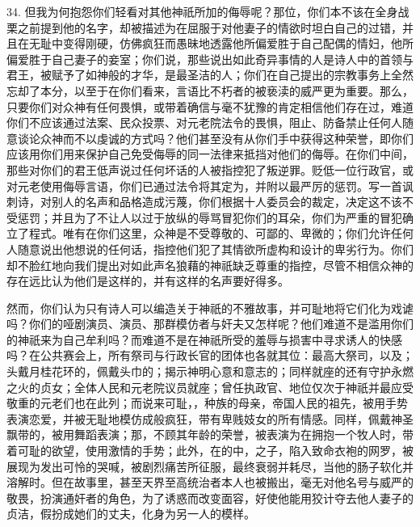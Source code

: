 34. 但我为何抱怨你们轻看对其他神祇所加的侮辱呢？那位，你们本不该在全身战栗之前提到他的名字，却被描述为在屈服于对他妻子的情欲时坦白自己的过错，并且在无耻中变得刚硬，仿佛疯狂而愚昧地透露他所偏爱胜于自己配偶的情妇，他所偏爱胜于自己妻子的妾室；你们说，那些说出如此奇异事情的人是诗人中的首领与君王，被赋予了如神般的才华，是最圣洁的人；你们在自己提出的宗教事务上全然忘却了本分，以至于在你们看来，言语比不朽者的被亵渎的威严更为重要。那么，只要你们对众神有任何畏惧，或带着确信与毫不犹豫的肯定相信他们存在过，难道你们不应该通过法案、民众投票、对元老院法令的畏惧，阻止、防备禁止任何人随意谈论众神而不以虔诚的方式吗？他们甚至没有从你们手中获得这种荣誉，即你们应该用你们用来保护自己免受侮辱的同一法律来抵挡对他们的侮辱。在你们中间，那些对你们的君王低声说过任何坏话的人被指控犯了叛逆罪。贬低一位行政官，或对元老使用侮辱言语，你们已通过法令将其定为，并附以最严厉的惩罚。写一首讽刺诗，对别人的名声和品格造成污蔑，你们根据十人委员会的裁定，决定这不该不受惩罚；并且为了不让人以过于放纵的辱骂冒犯你们的耳朵，你们为严重的冒犯确立了程式。唯有在你们这里，众神是不受尊敬的、可鄙的、卑微的；你们允许任何人随意说出他想说的任何话，指控他们犯了其情欲所虚构和设计的卑劣行为。你们却不脸红地向我们提出对如此声名狼藉的神祇缺乏尊重的指控，尽管不相信众神的存在远比认为他们是这样的，并有这样的名声要好得多。\par

然而，你们认为只有诗人可以编造关于神祇的不雅故事，并可耻地将它们化为戏谑吗？你们的哑剧演员、演员、那群模仿者与奸夫又怎样呢？他们难道不是滥用你们的神祇来为自己牟利吗？而难道不是在神祇所受的羞辱与损害中寻求诱人的快感吗？在公共赛会上，所有祭司与行政长官的团体也各就其位：最高大祭司，以及；头戴月桂花环的，佩戴头巾的；揭示神明心意和意志的；同样就座的还有守护永燃之火的贞女；全体人民和元老院议员就座；曾任执政官、地位仅次于神祇并最应受敬重的元老们也在此列；而说来可耻，，种族的母亲，帝国人民的祖先，被用手势表演恋爱，并被无耻地模仿成般疯狂，带有卑贱妓女的所有情感。同样，佩戴神圣飘带的，被用舞蹈表演；那，不顾其年龄的荣誉，被表演为在拥抱一个牧人时，带着可耻的欲望，使用激情的手势；此外，在的中，之子，陷入致命衣袍的网罗，被展现为发出可怜的哭喊，被剧烈痛苦所征服，最终衰弱并耗尽，当他的肠子软化并溶解时。但在故事里，甚至天界至高统治者本人也被搬出，毫无对他名号与威严的敬畏，扮演通奸者的角色，为了诱惑而改变面容，好使他能用狡计夺去他人妻子的贞洁，假扮成她们的丈夫，化身为另一人的模样。\par


